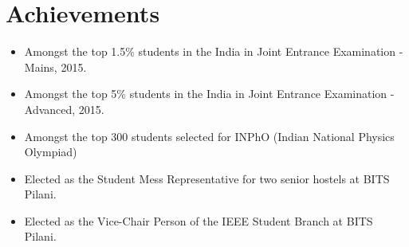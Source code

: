 \section{Achievements}
\begin{itemize}

    \item Amongst the top 1.5\% students in the India in Joint Entrance Examination - Mains, 2015.
    
    \item Amongst the top 5\% students in the India in Joint Entrance Examination - Advanced, 2015.
    
    \item Amongst the top 300 students selected for INPhO (Indian National Physics Olympiad)
    
    \item Elected as the Student Mess Representative for two senior hostels at BITS Pilani.
    
    \item Elected as the Vice-Chair Person of the IEEE Student Branch at BITS Pilani.
    
\end{itemize}
